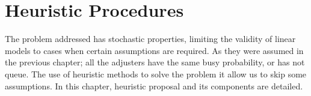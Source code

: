 \chapter{Heuristic Procedures}
\label{ch:Heuristic}
The problem addressed
has stochastic properties,
limiting the validity of linear models
to cases when certain assumptions are required.
As they were assumed in the previous chapter;
all the adjusters have the same busy probability,
or has not queue.
The use of heuristic methods
to solve the problem
it allow us to skip some assumptions.
In this chapter,
heuristic proposal
and its components
are detailed.



